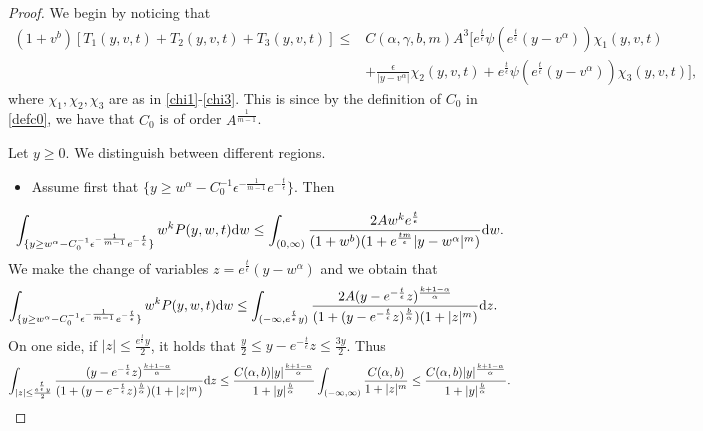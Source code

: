 \documentclass[11pt]{article}
\numberwithin{equation}{section}
\newcommand{\der}{\textup{d}}
\begin{document}
\begin{proof}



We begin by noticing that
\begin{align*}
  (1+v^{b})[T_{1}(y,v,t)+T_{2}(y,v,t)+T_{3}(y,v,t)] \leq &C(\alpha,\gamma,b,m)A^{3}\big[ e^{\frac{t}{\epsilon}}\psi(e^{\frac{t}{\epsilon}}(y-v^{\alpha}))     \chi_{1}(y,v,t)\\
  &+\frac{ \epsilon}{|y-v^{\alpha}|} \chi_{2}(y,v,t)+e^{\frac{t}{\epsilon}}\psi(e^{\frac{t}{\epsilon}}(y-v^{\alpha}))  \chi_{3}(y,v,t)\big],
\end{align*}
where $\chi_{1},\chi_{2},\chi_{3}$ are as in \eqref{chi1}-\eqref{chi3}. This is since by the definition of $C_{0}$ in \eqref{defc0}, we have that $C_{0}$ is of order $A^{\frac{1}{m-1}}$.


 Let $y\geq 0$. We distinguish between different regions. \begin{itemize}
\item Assume first that $\{y\geq w^{\alpha}-C_{0}^{-1}\epsilon^{-\frac{1}{m-1}} e^{-\frac{t}{\epsilon}}\}$. Then
\end{itemize}
\begin{align*}
    \int_{\{y\geq w^{\alpha}-C_{0}^{-1}\epsilon^{-\frac{1}{m-1}} e^{-\frac{t}{\epsilon}}\}}w^{k}P(y,w,t)\der w\leq \int_{(0,\infty)} \frac{2 A w^{k} e^{\frac{t}{\epsilon}}}{(1+w^{b})(1+e^{\frac{tm}{\epsilon}}|y-w^{\alpha}|^{m})}\der w.
\end{align*}
 We make the change of variables
 $z=e^{\frac{t}{\epsilon}}(y-w^{\alpha})$ and we obtain that
 \begin{align*}
        \int_{\{y\geq w^{\alpha}-C_{0}^{-1}\epsilon^{-\frac{1}{m-1}} e^{-\frac{t}{\epsilon}}\}}w^{k}P(y,w,t)\der w&\leq \int_{(-\infty,e^{\frac{t}{\epsilon}}y)} \frac{2A (y-e^{-\frac{t}{\epsilon}}z)^{\frac{k+1-\alpha}{\alpha}}}{(1+(y-e^{-\frac{t}{\epsilon}}z)^{\frac{b}{\alpha}})(1+|z|^{m})}\der z.
        \end{align*}
        On one side, if $|z|\leq \frac{e^{\frac{t}{\epsilon}}y}{2}$, it holds that $\frac{y}{2}\leq y-e^{-\frac{t}{\epsilon}}z\leq \frac{3 y}{2}$. Thus
        \begin{align}\label{step 1 moments} \int_{|z|\leq \frac{e^{\frac{t}{\epsilon}}y}{2}} \frac{(y-e^{-\frac{t}{\epsilon}}z)^{\frac{k+1-\alpha}{\alpha}}}{(1+(y-e^{-\frac{t}{\epsilon}}z)^{\frac{b}{\alpha}})(1+|z|^{m})}\der z\leq \frac{C(\alpha,b) |y|^{\frac{k+1-\alpha}{\alpha}}}{1+|y|^{\frac{b}{\alpha}}}\int_{(-\infty,\infty)} \frac{C(\alpha,b) }{1+|z|^{m}}\leq\frac{C(\alpha,b)| y|^{\frac{k+1-\alpha}{\alpha}}}{1+|y|^{\frac{b}{\alpha}}}.

\end{align}
\end{proof}
\end{document}
